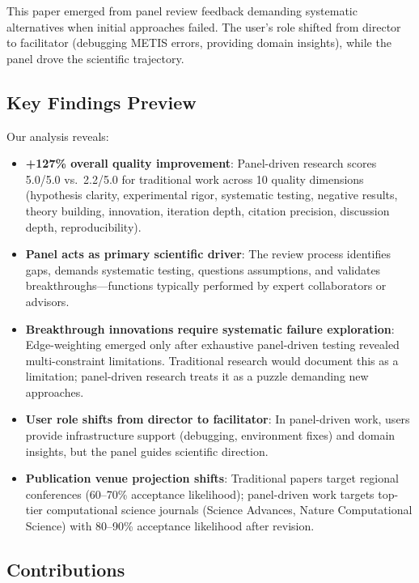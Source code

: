 This paper emerged from panel review feedback demanding systematic alternatives when initial approaches failed. The user's role shifted from director to facilitator (debugging METIS errors, providing domain insights), while the panel drove the scientific trajectory.

\subsection{Key Findings Preview}

Our analysis reveals:

\begin{itemize}[leftmargin=*]
\item \textbf{+127\% overall quality improvement}: Panel-driven research scores 5.0/5.0 vs.\ 2.2/5.0 for traditional work across 10 quality dimensions (hypothesis clarity, experimental rigor, systematic testing, negative results, theory building, innovation, iteration depth, citation precision, discussion depth, reproducibility).

\item \textbf{Panel acts as primary scientific driver}: The review process identifies gaps, demands systematic testing, questions assumptions, and validates breakthroughs---functions typically performed by expert collaborators or advisors.

\item \textbf{Breakthrough innovations require systematic failure exploration}: Edge-weighting emerged only after exhaustive panel-driven testing revealed multi-constraint limitations. Traditional research would document this as a limitation; panel-driven research treats it as a puzzle demanding new approaches.

\item \textbf{User role shifts from director to facilitator}: In panel-driven work, users provide infrastructure support (debugging, environment fixes) and domain insights, but the panel guides scientific direction.

\item \textbf{Publication venue projection shifts}: Traditional papers target regional conferences (60--70\% acceptance likelihood); panel-driven work targets top-tier computational science journals (Science Advances, Nature Computational Science) with 80--90\% acceptance likelihood after revision.
\end{itemize}

\subsection{Contributions}

